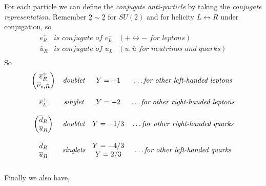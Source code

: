 For each particle we can define the \textit{conjugate} \textit{anti-particle} by taking the \textit{conjugate representation}. Remember $\overline{\underline{2}}\sim{}\underline{2}$ for $SU(2)$ and for helicity $L\longleftrightarrow R$ under conjugation, so 
\begin{equation}
    \begin{matrix}
        e^+_{R} & \textit{is conjugate of }e^-_L & (+\longleftrightarrow - \textit{ for leptons})\\
        \overline{u}_{R} &  \textit{is conjugate of }u_L & (u, \overline{u} \textit{ for neutrinos and quarks})\\
    \end{matrix}
\end{equation}
So 
\begin{equation}
    \begin{matrix}
        \begin{pmatrix}
            \overline{e}^+_R\\
            \overline{\nu}_{e,R}
        \end{pmatrix}& \textit{doublet}& Y=+1& \textit{\dots for other left-handed leptons}\\ \\
        \overline{e}^+_L & \textit{singlet} & Y = +2 & \textit{\dots for other right-handed leptons}\\ \\
        \begin{pmatrix}
            \overline{d}_R\\
            \overline{u}_{R}
        \end{pmatrix}& \textit{doublet}& Y=-1/3& \textit{\dots for other right-handed quarks}\\ \\
        \begin{matrix}
            \overline{d}_R\\
            \overline{u}_{R}
        \end{matrix}& \textit{singlets}& \begin{matrix}
            Y=-4/3\\
            Y = 2/3
        \end{matrix}    
        & \textit{\dots for other left-handed quarks}\\ \\
    \end{matrix}
\end{equation}
Finally we also have,

